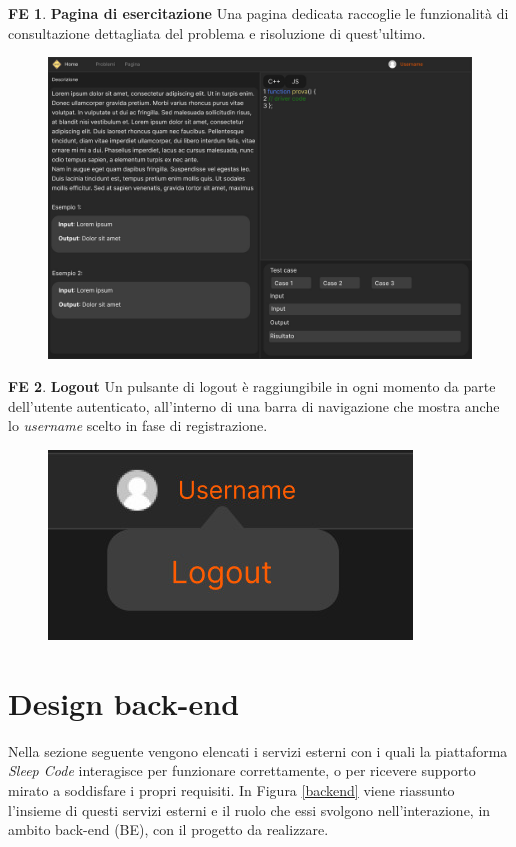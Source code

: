 \documentclass[11pt, a4paper]{article}
\theoremstyle{definition}
\newtheorem{frontend}{FE}
\begin{document}
\begin{frontend}
\label{exepage}
\textbf{Pagina di esercitazione }
Una pagina dedicata raccoglie le funzionalità di consultazione dettagliata
del problema e risoluzione di quest'ultimo.
\end{frontend}
\begin{figure}[H]
\centering
\includegraphics[scale=0.195]{materiale/immaginife/esercitazione.jpeg}
\end{figure}

\newpage


\begin{frontend}
\textbf{Logout }
Un pulsante di logout è raggiungibile in ogni momento da parte dell'utente
autenticato, all'interno di una barra di navigazione che mostra anche lo
\textit{username} scelto in fase di registrazione.
\end{frontend}
\begin{figure}[H]
\centering
\includegraphics[scale=0.2]{materiale/immaginife/logout.jpeg}
\end{figure}

\newpage
\section{Design back-end}
Nella sezione seguente vengono elencati i servizi esterni con i quali
la piattaforma \textit{Sleep Code} interagisce per funzionare
correttamente, o per ricevere supporto mirato a soddisfare i propri requisiti.
In Figura \ref{backend} viene riassunto l'insieme di questi servizi esterni
e il ruolo che essi svolgono nell'interazione, in ambito back-end (BE),
con il progetto da realizzare.
\end{document}
